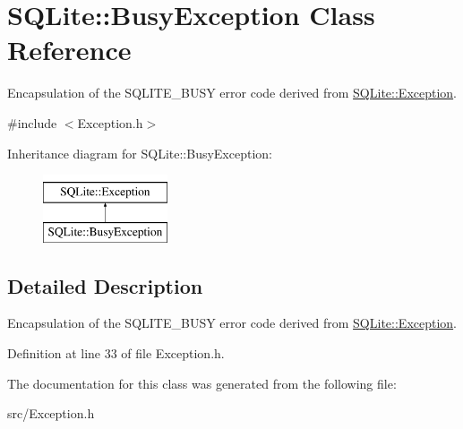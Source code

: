 \hypertarget{a00001}{\section{S\-Q\-Lite\-:\-:Busy\-Exception Class Reference}
\label{a00001}
}


Encapsulation of the S\-Q\-L\-I\-T\-E\-\_\-\-B\-U\-S\-Y error code derived from \hyperlink{a00003}{S\-Q\-Lite\-::\-Exception}.  




{\ttfamily \#include $<$Exception.\-h$>$}

Inheritance diagram for S\-Q\-Lite\-:\-:Busy\-Exception\-:\begin{figure}[H]
\begin{center}
\leavevmode
\includegraphics[height=2.000000cm]{a00001}
\end{center}
\end{figure}


\subsection{Detailed Description}
Encapsulation of the S\-Q\-L\-I\-T\-E\-\_\-\-B\-U\-S\-Y error code derived from \hyperlink{a00003}{S\-Q\-Lite\-::\-Exception}. 



Definition at line 33 of file Exception.\-h.



The documentation for this class was generated from the following file\-:\begin{DoxyCompactItemize}
\item 
src/Exception.\-h\end{DoxyCompactItemize}

